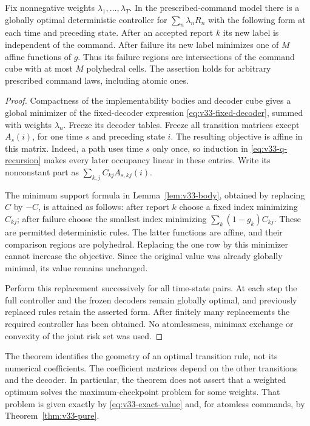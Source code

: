 \begin{theorem}\label{thm:v33-polyhedral}
Fix nonnegative weights $\lambda_1,\ldots,\lambda_T$. In the
prescribed-command model there is a globally optimal deterministic
controller for $\sum_n\lambda_n R_n$ with the following form at each
time and preceding state. After an accepted report $k$ its new label
is independent of the command. After failure its new label minimizes
one of $M$ affine functions of $g$. Thus its failure regions are
intersections of the command cube with at most $M$ polyhedral cells.
The assertion holds for arbitrary prescribed command laws, including
atomic ones.
\end{theorem}
\begin{proof}
Compactness of the implementability bodies and decoder cube gives a
global minimizer of the fixed-decoder expression
\eqref{eq:v33-fixed-decoder}, summed with weights $\lambda_n$.
Freeze its decoder tables. Freeze all transition matrices except
$A_s(i)$, for one time $s$ and preceding state $i$. The resulting
objective is affine in this matrix. Indeed, a path uses time $s$
only once, so induction in \eqref{eq:v33-q-recursion} makes every
later occupancy linear in these entries. Write its nonconstant part
as $\sum_{k,j}C_{kj}A_{s,kj}(i)$.

The minimum support formula in Lemma~\ref{lem:v33-body}, obtained
by replacing $C$ by $-C$, is attained as follows: after report $k$
choose a fixed index minimizing $C_{kj}$; after failure choose the
smallest index minimizing $\sum_k(1-g_k)C_{kj}$. These are permitted
deterministic rules. The latter functions are affine, and their
comparison regions are polyhedral. Replacing the one row by this
minimizer cannot increase the objective. Since the original value
was already globally minimal, its value remains unchanged.

Perform this replacement successively for all time-state pairs.
At each step the full controller and the frozen decoders remain
globally optimal, and previously replaced rules retain the asserted
form. After finitely many replacements the required controller has
been obtained. No atomlessness, minimax exchange or convexity of the
joint risk set was used.
\end{proof}

The theorem identifies the geometry of an optimal transition rule,
not its numerical coefficients. The coefficient matrices depend on
the other transitions and the decoder. In particular, the theorem
does not assert that a weighted optimum solves the maximum-checkpoint
problem for some weights. That problem is given exactly by
\eqref{eq:v33-exact-value} and, for atomless commands, by
Theorem~\ref{thm:v33-pure}.

